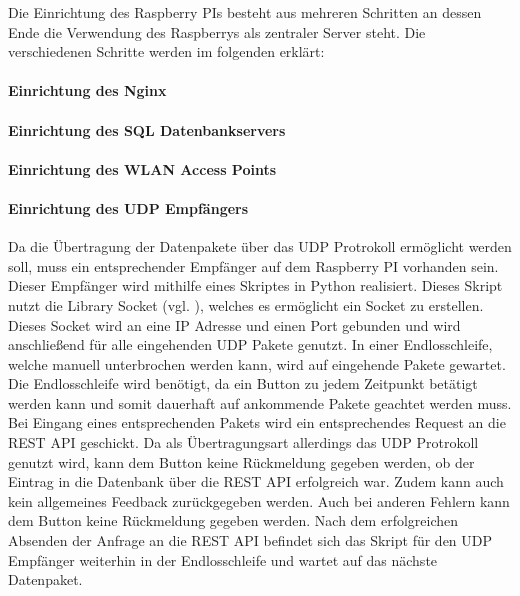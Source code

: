 Die Einrichtung des Raspberry PIs besteht aus mehreren Schritten an dessen Ende die Verwendung des Raspberrys als zentraler Server steht. Die verschiedenen Schritte werden im folgenden erklärt: 
\paragraph{Einrichtung des Nginx}  
\label{sec:Einrichtung des Nginx-1} 

\paragraph{Einrichtung des SQL Datenbankservers}  
\label{sec:Einrichtung des SQL Datenbankservers-1} 

\paragraph{Einrichtung des WLAN Access Points}  
\label{sec:Einrichtung des WLAN Access Points-1} 

\paragraph{Einrichtung des UDP Empfängers}  
\label{sec:Einrichtung des UDP Empfängers-1} 
Da die Übertragung der Datenpakete über das UDP Protrokoll ermöglicht werden soll, muss ein entsprechender Empfänger auf dem Raspberry PI vorhanden sein. Dieser Empfänger wird mithilfe eines Skriptes in Python realisiert. Dieses Skript nutzt die Library Socket (vgl. \cite{.20.02.2017}), welches es ermöglicht ein Socket zu erstellen. Dieses Socket wird an eine IP Adresse und einen Port gebunden und wird anschließend für alle eingehenden UDP Pakete genutzt. In einer Endlosschleife, welche manuell unterbrochen werden kann, wird auf eingehende Pakete gewartet. Die Endlosschleife wird benötigt, da ein Button zu jedem Zeitpunkt betätigt werden kann und somit dauerhaft auf ankommende Pakete geachtet werden muss. 
Bei Eingang eines entsprechenden Pakets wird ein entsprechendes Request an die REST API geschickt. Da als Übertragungsart allerdings das UDP Protrokoll genutzt wird, kann dem Button keine Rückmeldung gegeben werden, ob der Eintrag in die Datenbank über die REST API erfolgreich war. Zudem kann auch kein allgemeines Feedback zurückgegeben werden. Auch bei anderen Fehlern kann dem Button keine Rückmeldung gegeben werden. 
Nach dem erfolgreichen Absenden der Anfrage an die REST API befindet sich das Skript für den UDP Empfänger weiterhin in der Endlosschleife und wartet auf das nächste Datenpaket. 

